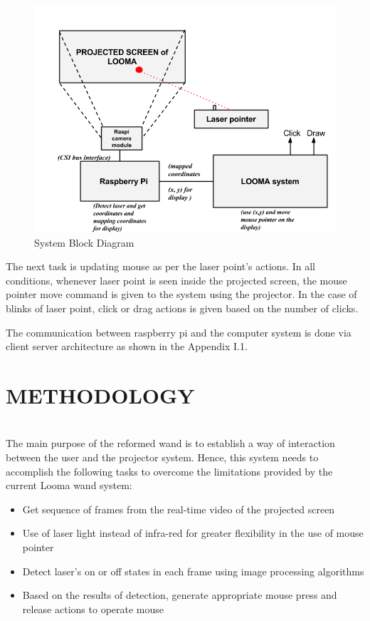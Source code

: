 \documentclass[12pt, a4paper]{article}
\begin{document}
{\begin{figure}[htp]
\centering
\includegraphics[scale=0.6]{proposed_system}
\caption{System Block Diagram}
\label{Block Diagram}
\end{figure}
The next task is updating mouse as per the laser point's actions. In all conditions, whenever laser point is seen inside the projected screen, the mouse pointer move command is given to the system using the projector. In the case of blinks of laser point, click or drag actions is given based on the number of clicks. 

The communication between raspberry pi and the computer system is done via client server architecture as shown in the Appendix I.1.
\newpage
\section{METHODOLOGY}
~\\
The main purpose of the reformed wand is to establish a way of interaction between the user and the projector system. Hence, this system needs to accomplish the following tasks to overcome the limitations provided by the current Looma wand system:
\begin{itemize}
\item Get sequence of frames from the real-time video of the projected screen
\item Use of laser light instead of infra-red for greater flexibility in the use of mouse pointer
\item Detect laser’s on or off states in each frame using image processing algorithms
\item Based on the results of detection, generate appropriate mouse press and release actions to operate mouse
\end{itemize}

}
\end{document}
